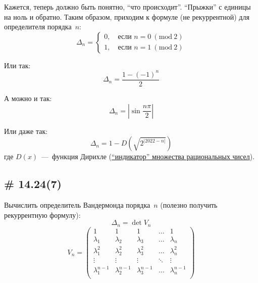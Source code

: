 \documentclass[a4paper,12pt]{article}
\newcommand{\mmod}[1]{\ (\mathrm{mod}\ #1)}
\theoremstyle{remark}
\begin{document}
\begin{solution}
    Кажется, теперь должно быть понятно, ``что происходит''.
    ``Прыжки'' с единицы на ноль и обратно.
    Таким образом, приходим к формуле (не рекуррентной) для определителя порядка~$n$:
    \[
      \Delta_n = \begin{cases}
        0,\quad \mbox{если } n = 0 \mmod{2}\\
        1,\quad \mbox{если } n = 1 \mmod{2}
      \end{cases}
    \]
    
    Или так:
    \[
      \Delta_n = \frac{1 - (-1)^n}{2}
    \]
    
    А можно и так:
    \[
      \Delta_n = \left|\sin{\frac{n \pi}{2}}\right|
    \]
    
    Или даже так:
    \[
      \Delta_n = 1 - D\left(\sqrt{2^{|2022 - n|}}\right)
    \]
    где $D(x)$~---~функция Дирихле (\href{https://en.wikipedia.org/wiki/Dirichlet_function}{``индикатор'' множества рациональных чисел}).
  \end{solution}
  
  
  \subsection{\# 14.24(7)}
  
  Вычислить определитель Вандермонда порядка~$n$ (полезно получить рекуррентную формулу):
  \[
    \Delta_n = \det V_n
  \]
  \[
    V_n = \begin{pmatrix}
      1               & 1               & 1               & \ldots & 1\\
      \lambda_1       & \lambda_2       & \lambda_3       & \ldots & \lambda_n\\
      \lambda_1^2     & \lambda_2^2     & \lambda_3^2     & \ldots & \lambda_n^2\\
      \vdots          & \vdots          & \vdots          & \ddots & \vdots\\
      \lambda_1^{n-1} & \lambda_2^{n-1} & \lambda_3^{n-1} & \ldots & \lambda_n^{n-1}\\
    \end{pmatrix}
  \]
  
\end{document}
